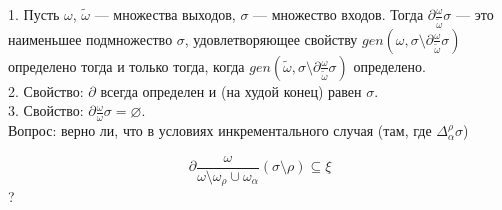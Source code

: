 

 
 
1. Пусть $\omega$, $\tilde{\omega}$ --- множества выходов, $\sigma$ --- множество входов.
	Тогда $\partial\frac{\omega}{\tilde{\omega}}\sigma$ --- это наименьшее подмножество $\sigma$, удовлетворяющее свойству $gen(\omega,\sigma\setminus\partial\frac{\omega}{\tilde{\omega}}\sigma)$ определено тогда и только тогда, когда $gen(\tilde{\omega},\sigma\setminus\partial\frac{\omega}{\tilde{\omega}}\sigma)$ определено.
\\

2. Свойство: $\partial$ всегда определен и (на худой конец) равен $\sigma$.
\\

3. Свойство: $\partial\frac{\omega}{\omega}\sigma=\varnothing$.
\\

Вопрос: верно ли, что в условиях инкрементального случая (там, где $\Delta^\rho_\alpha\sigma$)

$$\partial\frac{\omega}{\omega\setminus\omega_\rho\cup\omega_\alpha}(\sigma\setminus\rho)\subseteq\xi$$ ? 

